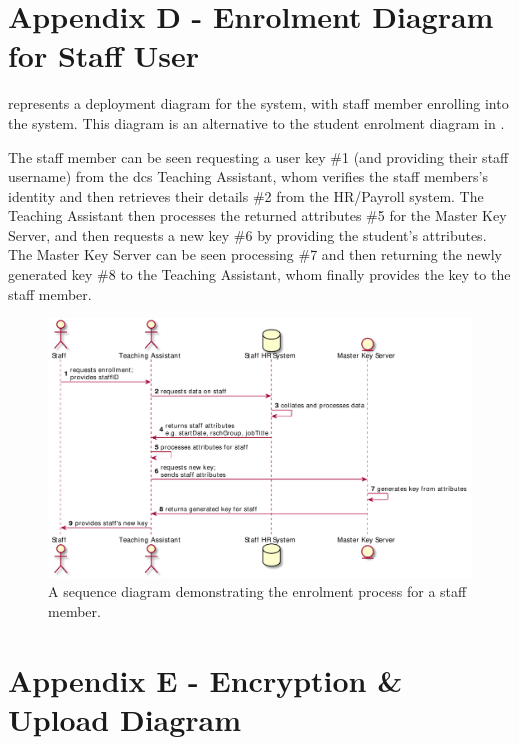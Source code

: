 \begin{appendices}
\clearpage

\section{Appendix D - Enrolment Diagram for Staff User}
\label{appendix:enrolment_diagram}

 represents a deployment diagram for the \theResServer system, with staff member enrolling into the system. This diagram is an alternative to the student enrolment diagram in .

The staff member can be seen requesting a user key \#1 (and providing their staff username) from the \acrshort{dcs} Teaching Assistant, whom verifies the staff members's identity and then retrieves their details \#2 from the HR/Payroll system. The Teaching Assistant then processes the returned attributes \#5 for the Master Key Server, and then requests a new key \#6 by providing the student's attributes. The Master Key Server can be seen processing \#7 and then returning the newly generated key \#8 to the Teaching Assistant, whom finally provides the key to the staff member.

\begin{figure}[htp]
    \centering
    \label{fig:appendix_sta_deployment}
    \includegraphics[width=\linewidth,keepaspectratio]{appendices/diagrams/flow_of_info/enrollment_sta_sequence.pdf}

    \caption{A sequence diagram demonstrating the enrolment process for a staff member.}

\end{figure}

\clearpage

\section{Appendix E - Encryption \& Upload Diagram}
\label{appendix:enc_upl_diagram}


\end{appendices}
